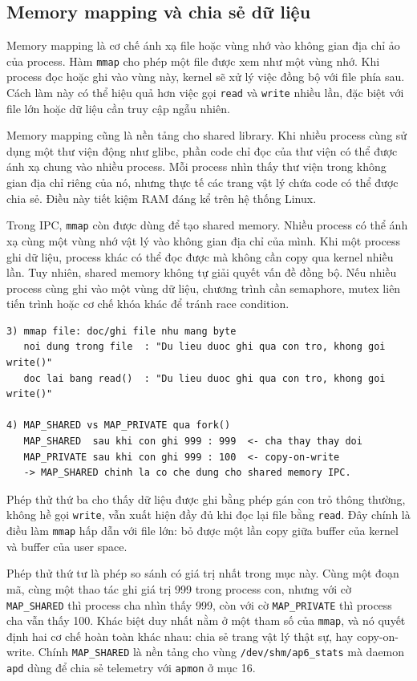 \documentclass[11pt]{article}
\newcommand{\code}[1]{\texttt{#1}}
\begin{document}
\subsection{Memory mapping và chia sẻ dữ liệu}

Memory mapping là cơ chế ánh xạ file hoặc vùng nhớ vào không gian địa chỉ ảo của process. Hàm \code{mmap} cho phép một file được xem như một vùng nhớ. Khi process đọc hoặc ghi vào vùng này, kernel sẽ xử lý việc đồng bộ với file phía sau. Cách làm này có thể hiệu quả hơn việc gọi \code{read} và \code{write} nhiều lần, đặc biệt với file lớn hoặc dữ liệu cần truy cập ngẫu nhiên.

Memory mapping cũng là nền tảng cho shared library. Khi nhiều process cùng sử dụng một thư viện động như glibc, phần code chỉ đọc của thư viện có thể được ánh xạ chung vào nhiều process. Mỗi process nhìn thấy thư viện trong không gian địa chỉ riêng của nó, nhưng thực tế các trang vật lý chứa code có thể được chia sẻ. Điều này tiết kiệm RAM đáng kể trên hệ thống Linux.

Trong IPC, \code{mmap} còn được dùng để tạo shared memory. Nhiều process có thể ánh xạ cùng một vùng nhớ vật lý vào không gian địa chỉ của mình. Khi một process ghi dữ liệu, process khác có thể đọc được mà không cần copy qua kernel nhiều lần. Tuy nhiên, shared memory không tự giải quyết vấn đề đồng bộ. Nếu nhiều process cùng ghi vào một vùng dữ liệu, chương trình cần semaphore, mutex liên tiến trình hoặc cơ chế khóa khác để tránh race condition.

\begin{lstlisting}[caption={\code{mmap} file và khác biệt MAP\_SHARED / MAP\_PRIVATE qua \code{fork}}]
3) mmap file: doc/ghi file nhu mang byte
   noi dung trong file  : "Du lieu duoc ghi qua con tro, khong goi write()"
   doc lai bang read()  : "Du lieu duoc ghi qua con tro, khong goi write()"

4) MAP_SHARED vs MAP_PRIVATE qua fork()
   MAP_SHARED  sau khi con ghi 999 : 999  <- cha thay thay doi
   MAP_PRIVATE sau khi con ghi 999 : 100  <- copy-on-write
   -> MAP_SHARED chinh la co che dung cho shared memory IPC.
\end{lstlisting}

Phép thử thứ ba cho thấy dữ liệu được ghi bằng phép gán con trỏ thông thường, không hề gọi \code{write}, vẫn xuất hiện đầy đủ khi đọc lại file bằng \code{read}. Đây chính là điều làm \code{mmap} hấp dẫn với file lớn: bỏ được một lần copy giữa buffer của kernel và buffer của user space.

Phép thử thứ tư là phép so sánh có giá trị nhất trong mục này. Cùng một đoạn mã, cùng một thao tác ghi giá trị 999 trong process con, nhưng với cờ \code{MAP\_SHARED} thì process cha nhìn thấy 999, còn với cờ \code{MAP\_PRIVATE} thì process cha vẫn thấy 100. Khác biệt duy nhất nằm ở một tham số của \code{mmap}, và nó quyết định hai cơ chế hoàn toàn khác nhau: chia sẻ trang vật lý thật sự, hay copy-on-write. Chính \code{MAP\_SHARED} là nền tảng cho vùng \code{/dev/shm/ap6\_stats} mà daemon \code{apd} dùng để chia sẻ telemetry với \code{apmon} ở mục 16.
\end{document}
